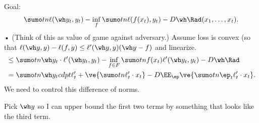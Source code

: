 
Goal: 
\begin{align}
\sumo tn \ell(\wh y_t, y_t) - \inf_{f}\sumo tn \ell(f(x_t),y_t) - D\wh\Rad(x_1,\ldots, x_t).
\end{align}•
(Think of this as value of game against adversary.)
Assume loss is convex (so that $\ell(\wh y, y) - \ell(f, y) \le \ell'(\wh y, y) (\wh y-f)$ and linearize.
\begin{align}
&\le \sumo tn \wh y_t\cdot \ell'(\wh y_t,y_t) 
-\inf_{f\in F} \sumo tn f(x_t) \ell'(\wh y_t,y_t)  - D\wh \Rad\\
&=\sumo tn \wh y_t cdpt \ell_t' + 
\ve{\sumo tn \ell_t' \cdot x_t} 
- D\EE_\ep \ve{\sumo tn \ep_t \ell_t'\cdot x_t}.
\end{align}
We need to control this difference of norms.

Pick $\wh y$ so I can upper bound the first two terms by something that looks like the third term.

